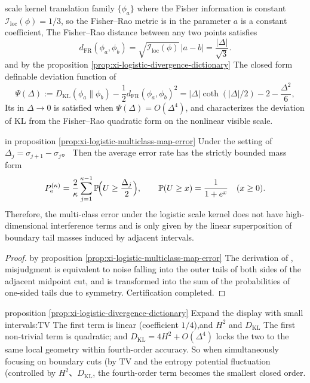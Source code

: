 \begin{remark}\label{rem:xi-logistic-fisher-rao-and-curvature}
scale kernel translation family \(\{\phi_a\}\) where the Fisher information is constant \(\mathcal I_{\mathrm{loc}}(\phi)=1/3\), so the Fisher--Rao metric is in the parameter \(a\) is a constant coefficient,
The Fisher--Rao distance between any two points satisfies
\[
d_{\mathrm{FR}}(\phi_a,\phi_b)=\sqrt{\mathcal I_{\mathrm{loc}}(\phi)}\,|a-b|=\frac{|\Delta|}{\sqrt3}.
\]
and by the proposition \ref{prop:xi-logistic-divergence-dictionary} The closed form definable deviation function of
\[
\Psi(\Delta):=D_{\mathrm{KL}}(\phi_a\|\phi_b)-\frac{1}{2}d_{\mathrm{FR}}(\phi_a,\phi_b)^{2}
=|\Delta|\coth(|\Delta|/2)-2-\frac{\Delta^{2}}{6},
\]
Its in \(\Delta\to 0\) is satisfied when \(\Psi(\Delta)=O(\Delta^{4})\), and characterizes the deviation of KL from the Fisher--Rao quadratic form on the nonlinear visible scale.
\end{remark}

\begin{corollary}\label{cor:xi-logistic-boundary-mass-error}
in proposition \ref{prop:xi-logistic-multiclass-map-error} Under the setting of \(\Delta_j=\sigma_{j+1}-\sigma_j\)。
Then the average error rate has the strictly bounded mass form
\[
P_{\mathrm e}^{(\kappa)}
=\frac{2}{\kappa}\sum_{j=1}^{\kappa-1}\mathbb P\!\Bigl(U\ge \frac{\Delta_j}{2}\Bigr),
\qquad
\mathbb P(U\ge x)=\frac{1}{1+e^{x}}\quad(x\ge 0).
\]
Therefore, the multi-class error under the logistic scale kernel does not have high-dimensional interference terms and is only given by the linear superposition of boundary tail masses induced by adjacent intervals.
\end{corollary}
\begin{proof}
by proposition \ref{prop:xi-logistic-multiclass-map-error} The derivation of , misjudgment is equivalent to noise falling into the outer tails of both sides of the adjacent midpoint cut, and is transformed into the sum of the probabilities of one-sided tails due to symmetry. Certification completed.
\end{proof}

\begin{remark}\label{rem:xi-logistic-fourth-order-closure}
proposition \ref{prop:xi-logistic-divergence-dictionary} Expand the display with small intervals:\(\mathrm{TV}\) The first term is linear (coefficient \(1/4\)),and \(H^{2}\) and \(D_{\mathrm{KL}}\) The first non-trivial term is quadratic;
and \(D_{\mathrm{KL}}=4H^{2}+O(\Delta^{4})\) locks the two to the same local geometry within fourth-order accuracy.
So when simultaneously focusing on boundary cuts (by \(\mathrm{TV}\) and the entropy potential fluctuation (controlled by \(H^{2}\)、\(D_{\mathrm{KL}}\), the fourth-order term becomes the smallest closed order.
\end{remark}

